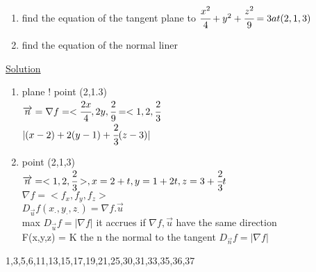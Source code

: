 \begin{example}
\begin{enumerate}
    \item find the equation of the tangent plane to $\cfrac{x^{2}}{4} + y^{2} + \cfrac{z^{2}}{9} = 3 at (2,1,3)$
    \item find the equation of the normal liner
\end{enumerate}

\underline{\textbf{\large}\color{smalt(darkpowderblue)}Solution}
\begin{enumerate}
    \item plane ! point (2,1.3) \\
${\overrightarrow{n}} = \nabla f = <\cfrac{2x}{4},2y,\cfrac{2}{9} = <1,2,\cfrac{2}{3}$ \\
$|(x-2) + 2(y-1) + \cfrac{2}{3} (z-3)|$
\item point (2,1,3)\\
${\overrightarrow{n}} = <1,2,\cfrac{2}{3}> , x=2+t \\
                                          , y=1+2t\\
                                          , z=3+\cfrac{2}{3}t $\\
$\nabla f = <f_x,f_y,f_z>$\\
$D_{\overrightarrow{u}} f(x_\cdot , y_\cdot , z_\cdot) = \nabla f .{\overrightarrow{u}}$\\
max $D_{\overrightarrow{u}} f = |\nabla f|$ it accrues if $\nabla f ,{\overrightarrow{u}}$ have the same direction \\
F(x,y,z) = K the n the normal to the tangent $D_{\overrightarrow{n}} f = |\nabla f|$ 
\end{enumerate}
\end{example}
\noindent{\color{smalt(darkpowderblue)}\rule{\linewidth}{.2mm}}
\begin{problem}
1,3,5,6,11,13,15,17,19,21,25,30,31,33,35,36,37
\end{problem}
